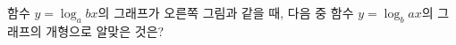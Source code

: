 \noindent\begin{minipage}[t]{0.58\linewidth}\vspace{0pt}\raggedright 함수 $y=\log_a bx$의 그래프가 오른쪽 그림과 같을 때, 다음 중 함수 $y=\log_b ax$의 그래프의 개형으로 알맞은 것은?\end{minipage}\hfill\begin{minipage}[t]{0.4\linewidth}\vspace{0pt}\centering \resizebox{\ifdim\width>\linewidth\linewidth\else\width\fi}{!}{}\end{minipage}\par
\begin{choicesii}{}{}{}{}{}\end{choicesii}
